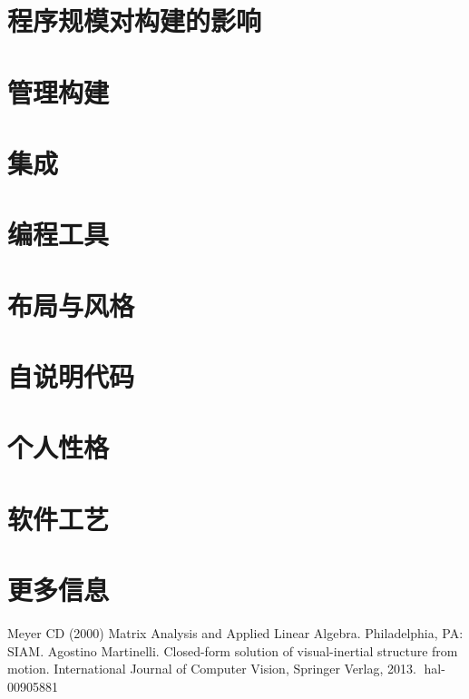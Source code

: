 \documentclass{article}
\begin{document}
\section{程序规模对构建的影响}

\section{管理构建}

\section{集成}

\section{编程工具}

\section{布局与风格}

\section{自说明代码}

\section{个人性格}

\section{软件工艺}

\section{更多信息}


\begin{thebibliography}{99}  
    Meyer CD (2000) Matrix Analysis and Applied Linear Algebra. Philadelphia, PA: SIAM.
     Agostino Martinelli. Closed-form solution of visual-inertial structure from motion. International
    Journal of Computer Vision, Springer Verlag, 2013. ￿hal-00905881
\end{thebibliography}
\end{document}
